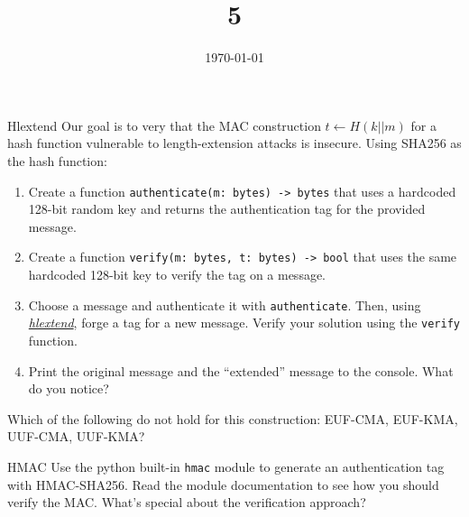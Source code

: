 \documentclass{practice}
\title{5}
\date{\today}
\begin{document}
\maketitle

\begin{task}{Hlextend}
  Our goal is to very that the MAC construction $t \gets H(k||m)$ for a hash function vulnerable to length-extension attacks is insecure.
  Using SHA256 as the hash function:
  \begin{enumerate}
    \item Create a function \texttt{authenticate(m: bytes) -> bytes} that uses a hardcoded 128-bit random key and returns the authentication tag for the provided message.
    \item Create a function \texttt{verify(m: bytes, t: bytes) -> bool} that uses the same hardcoded 128-bit key to verify the tag on a message.
    \item Choose a message and authenticate it with \texttt{authenticate}.
    Then, using \href{https://github.com/stephenbradshaw/hlextend}{\emph{hlextend}}, forge a tag for a new message.
    Verify your solution using the \texttt{verify} function.
    \item Print the original message and the \enquote{extended} message to the console.
    What do you notice?
  \end{enumerate}

  Which of the following do not hold for this construction: EUF-CMA, EUF-KMA, UUF-CMA, UUF-KMA?
\end{task}

\begin{task}{HMAC}
  Use the python built-in \texttt{hmac} module to generate an authentication tag with HMAC-SHA256.
  Read the module documentation to see how you should verify the MAC.
  What's special about the verification approach?
\end{task}
\end{document}
